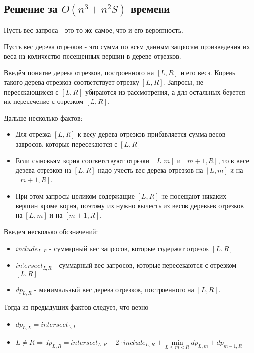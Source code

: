 \subsection{Решение за $O(n^3 + n^2S)$ времени}

Пусть вес запроса - это то же самое, что и его вероятность.

Пусть вес дерева отрезков - это сумма по всем данным запросам произведения их веса на количество посещенных вершин в дереве отрезков.

Введём понятие дерева отрезков, построенного на $[L, R]$ и его веса.
Корень такого дерева отрезков соответствует отрезку $[L, R]$. Запросы, не пересекающиеся с $[L, R]$ убираются из рассмотрения, а для остальных берется их пересечение с отрезком $[L, R]$.

Дальше несколько фактов:

\begin{itemize}
    \item Для отрезка $[L, R]$ к весу дерева отрезков прибавляется сумма весов запросов, которые пересекаются с $[L, R]$
    \item Если сыновьям корня соответствуют отрезки $[L, m]$ и $[m + 1, R]$, то в весе дерева отрезков на $[L, R]$ надо
    учесть вес дерева отрезков на $[L, m]$ и на $[m + 1, R]$.
    \item При этом запросы целиком содержащие $[L, R]$ не посещают никаких вершин кроме корня, поэтому их нужно
    вычесть из весов деревьев отрезков на $[L, m]$ и на $[m + 1, R]$.
\end{itemize}
    
Введем несколько обозначений:

\begin{itemize}
    \item $include_{L, R}$ - суммарный вес запросов, которые содержат отрезок $[L, R]$
    \item $intersect_{L, R}$ - суммарный вес запросов, которые пересекаются с отрезком $[L, R]$
    \item $dp_{L, R}$ - минимальный вес дерева отрезков, построенного на $[L, R]$.
\end{itemize}

Тогда из предыдущих фактов следует, что верно

\begin{itemize}
    \item $dp_{L, L} = intersect_{L, L}$
    \item $L \ne R \Rightarrow dp_{L, R} = intersect_{L, R} - 2 \cdot include_{L, R} +
    \min \limits_{L \leqslant m < R} {dp_{L, m} + dp_{m + 1, R}}$
\end{itemize}

